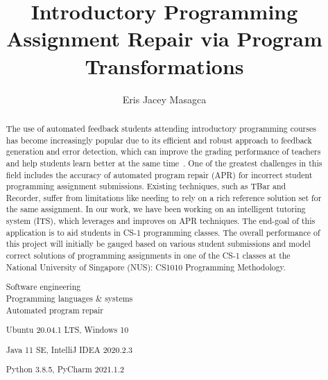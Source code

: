 \documentclass[fyp,12pt]{socreport}
\newcommand{\itab}[1]{\hspace{0em}\rlap{#1}}
\newcommand{\tab}[1]{\hspace{.11\textwidth}\rlap{#1}}
\begin{document}

\title{Introductory Programming Assignment Repair via Program Transformations}
\author{Eris Jacey Masagca}
\deliverables{
    \item \itab{Report:} \tab{1 Volume}
}
\maketitle

\begin{abstract}

The use of automated feedback students attending introductory programming courses has become
increasingly popular due to its efficient and robust approach to feedback generation and error
detection, which can improve the grading performance of teachers and help students learn better
at the same time~\cite{haldeman2021automated}.
One of the greatest challenges in this field includes the accuracy of automated program repair (APR)
for incorrect student programming assignment submissions.
Existing techniques, such as TBar and Recorder, suffer from limitations like needing to rely on
a rich reference solution set for the same assignment.
In our work, we have been working on an intelligent tutoring system (ITS), which leverages and
improves on APR techniques.
The end-goal of this application is to aid students in CS-1 programming classes.
The overall performance of this project will initially be gauged based on various student submissions
and model correct solutions of programming assignments in one of the CS-1 classes at the National
University of Singapore (NUS): CS1010 Programming Methodology.

\begin{descriptors} %
    \item \itab{TODO}	\tab{TODO}
\end{descriptors}
\begin{keywords}
    Software engineering \\
    Programming languages \& systems \\
    Automated program repair
\end{keywords}

\begin{implement}
    \item{Ubuntu 20.04.1 LTS, Windows 10}
    \item{Java 11 SE, IntelliJ IDEA 2020.2.3}
    \item{Python 3.8.5, PyCharm 2021.1.2}
\end{implement}

\end{abstract}
\end{document}
